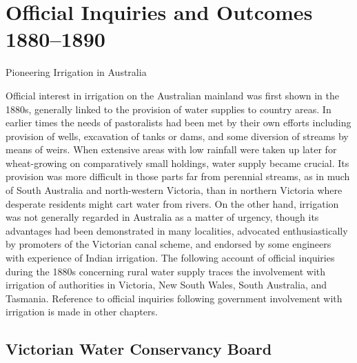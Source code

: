 
\setcounter{endnote}{0}

\chapter{Official Inquiries and Outcomes 1880--1890}
\label{ch:inquiries}
%
{Pioneering Irrigation in Australia}

Official interest in irrigation on the Australian mainland was first
shown in the 1880s, generally linked to the provision of water
supplies to country areas.  In earlier times the needs of pastoralists
had been met by their own efforts including provision of wells,
excavation of tanks or dams, and some diversion of streams by means of
weirs.  When extensive areas with low rainfall were taken up later for
wheat-growing on comparatively small holdings, water supply became
crucial.  Its provision was more difficult in those parts far from
perennial streams, as in much of South Australia and north-western
Victoria, than in northern Victoria where desperate residents might
cart water from rivers.  On the other hand, irrigation was not
generally regarded in Australia as a matter of urgency, though its
advantages had been demonstrated in many localities, advocated
enthusiastically by promoters of the Victorian canal scheme, and
endorsed by some engineers with experience of Indian irrigation.  The
following account of official inquiries during the 1880s concerning
rural water supply traces the involvement with irrigation of
authorities in Victoria, New South Wales, South Australia, and
Tasmania.  Reference to official inquiries following government
involvement with irrigation is made in other chapters.

\section*{Victorian Water Conservancy Board}


